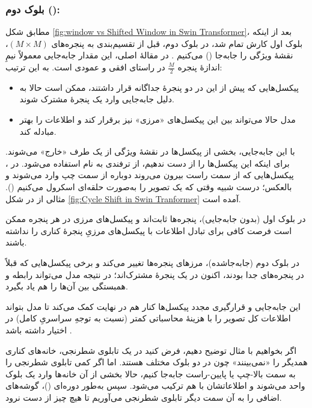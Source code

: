 \subsubsection{بلوک دوم ():}
مطابق شکل \ref{fig:window vs Shifted Window in Swin Transformer}، بعد از اینکه بلوک اول کارش تمام شد، در بلوک دوم، قبل از تقسیم‌بندی به پنجره‌های 
\(\displaystyle (M \times M)\)، نقشهٔ ویژگی را جابه‌جا (\textit{}) می‌کنیم \cite{liu2021swintransformer}.
در مقالهٔ اصلی، این مقدار جابه‌جایی معمولاً نیمِ اندازهٔ پنجره 
\(\displaystyle \frac{M}{2}\)
در راستای افقی و عمودی است. به این ترتیب:

\begin{itemize}
	\item پیکسل‌هایی که پیش از این در دو پنجرهٔ جداگانه قرار داشتند، ممکن است حالا به دلیل جابه‌جایی وارد یک پنجرهٔ مشترک شوند.
	\item مدل حالا می‌تواند بین این پیکسل‌های «مرزی» نیز  برقرار کند و اطلاعات را بهتر مبادله کند.
\end{itemize}

با این جابه‌جایی، بخشی از پیکسل‌ها در نقشهٔ ویژگی از یک طرف «خارج» می‌شوند. برای اینکه این پیکسل‌ها را از دست ندهیم، از ترفندی به نام  استفاده می‌شود. در ، پیکسل‌هایی که از سمت راست بیرون می‌روند دوباره از سمت چپ وارد می‌شوند و بالعکس؛ درست شبیه وقتی که یک تصویر را به‌صورت حلقه‌ای اسکرول می‌کنیم (). مثالی از  در شکل \ref{fig:Cycle Shift in Swin Tranformer} آمده است.

در بلوک اول (بدون جابه‌جایی)، پنجره‌ها ثابت‌اند و پیکسل‌های مرزی در هر پنجره ممکن است فرصت کافی برای تبادل اطلاعات با پیکسل‌های مرزیِ پنجرهٔ کناری را نداشته باشند.

در بلوک دوم (جابه‌جاشده)، مرزهای پنجره‌ها تغییر می‌کند و برخی پیکسل‌هایی که قبلاً در پنجره‌های جدا بودند، اکنون در یک پنجرهٔ مشترک‌اند؛ در نتیجه مدل می‌تواند رابطه و همبستگی بین آن‌ها را هم یاد بگیرد.

این جابه‌جایی و قرارگیری مجدد پیکسل‌ها کنار هم در نهایت کمک می‌کند تا مدل بتواند اطلاعات کل تصویر را با هزینهٔ محاسباتی کمتر (نسبت به توجهِ سراسریِ کامل) در اختیار داشته باشد \cite{liu2021swintransformer}.

اگر بخواهیم با مثال توضیح دهیم، فرض کنید در یک تابلوی شطرنجی، خانه‌های کناری همدیگر را «نمی‌بینند» چون در دو بلوک مختلف هستند.
اما اگر کمی تابلوی شطرنجی را به سمت بالا-چپ یا پایین-راست جابه‌جا کنیم،
حالا بخشی از آن خانه‌ها وارد یک بلوک واحد می‌شوند و اطلاعاتشان با هم ترکیب می‌شود.
سپس به‌طور دوره‌ای (\textit{})، گوشه‌های اضافی را به آن سمت دیگر تابلوی شطرنجی می‌آوریم
تا هیچ چیز از دست نرود.

